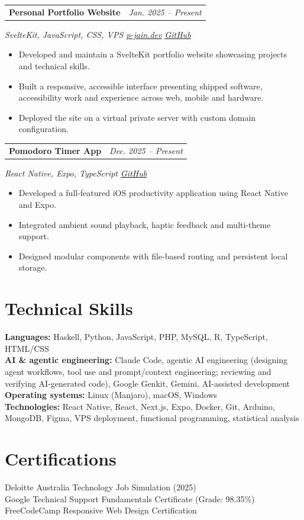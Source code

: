 \documentclass[10pt,a4paper]{article}
\makeatletter
\let\oldhref\href
\renewcommand{\href}[2]{\oldhref{#1}{\underline{#2}}}
\newcommand{\resumeProject}[3]{%
  \begin{tabularx}{\textwidth}{@{}Xr@{}}
    \textbf{#1} & \textit{#2}
  \end{tabularx}
  \textit{\color{muted}#3}
  \vspace{-1pt}
}
\makeatother
\begin{document}
\resumeProject{Personal Portfolio Website}{Jan. 2025 -- Present}{SvelteKit, JavaScript, CSS, VPS \textbar{} \href{https://p-jain.dev}{p-jain.dev} \textbar{} \href{https://github.com/pjrus/p-jain-dev}{GitHub}}
\begin{itemize}
  \item Developed and maintain a SvelteKit portfolio website showcasing projects and technical skills.
  \item Built a responsive, accessible interface presenting shipped software, accessibility work and experience across web, mobile and hardware.
  \item Deployed the site on a virtual private server with custom domain configuration.
\end{itemize}

\resumeProject{Pomodoro Timer App}{Dec. 2025 -- Present}{React Native, Expo, TypeScript \textbar{} \href{https://github.com/pjrus/pomo-app}{GitHub}}
\begin{itemize}
  \item Developed a full-featured iOS productivity application using React Native and Expo.
  \item Integrated ambient sound playback, haptic feedback and multi-theme support.
  \item Designed modular components with file-based routing and persistent local storage.
\end{itemize}

\section{Technical Skills}
\textbf{Languages:} Haskell, Python, JavaScript, PHP, MySQL, R, TypeScript, HTML/CSS\\
\textbf{AI \& agentic engineering:} Claude Code, agentic AI engineering (designing agent workflows, tool use and prompt/context engineering; reviewing and verifying AI-generated code), Google Genkit, Gemini, AI-assisted development\\
\textbf{Operating systems:} Linux (Manjaro), macOS, Windows\\
\textbf{Technologies:} React Native, React, Next.js, Expo, Docker, Git, Arduino, MongoDB, Figma, VPS deployment, functional programming, statistical analysis

\section{Certifications}
Deloitte Australia Technology Job Simulation (2025)\\
Google Technical Support Fundamentals Certificate (Grade: 98.35\%)\\
FreeCodeCamp Responsive Web Design Certification
\end{document}
